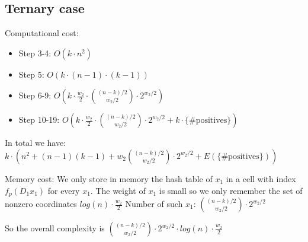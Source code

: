 \documentclass[12pt]{article}
\begin{document}
\subsection{Ternary case}

Computational cost:
\begin{itemize}
    \item Step 3-4: $O(k \cdot n^2)$
    \item Step 5: $O(k \cdot (n-1) \cdot (k-1))$
    \item Step 6-9: $O(k \cdot \frac{w_2}{2} \cdot \binom{(n-k)/2}{w_2/2} \cdot 2^{w_2/2})$
    \item Step 10-19: $O(k \cdot \frac{w_2}{2} \cdot \binom{(n-k)/2}{w_2/2} \cdot 2^{w_2/2} + k \cdot \{\text{\# positives}\})$
\end{itemize}
In total we have: $k \cdot (n^2 + (n-1)(k-1) + w_2\binom{(n-k)/2}{w_2/2} \cdot 2^{w_2/2} + E(\{\text{\# positives}\}))$

Memory cost:
We only store in memory the hash table of $x_1$ in a cell with index $f_{p}(D_1x_1)$ for every $x_1$.
The weight of $x_1$ is small so we only remember the set of nonzero coordinates $log(n) \cdot \frac{w_2}{2}$ Number of such $x_1$: $\binom{(n-k)/2}{w_2/2} \cdot 2^{w_2/2}$

So the overall complexity is  $\binom{(n-k)/2}{w_2/2} \cdot 2^{w_2/2} \cdot log(n) \cdot \frac{w_2}{2}$
\end{document}
